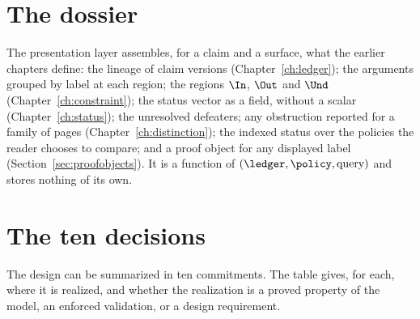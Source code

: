 \section{The dossier}\label{sec:dossier}

The presentation layer assembles, for a claim and a surface, what the earlier chapters define: the lineage of claim versions (Chapter~\ref{ch:ledger}); the arguments grouped by label at each region; the regions $\In$, $\Out$ and $\Und$ (Chapter~\ref{ch:constraint}); the status vector as a field, without a scalar (Chapter~\ref{ch:status}); the unresolved defeaters; any obstruction reported for a family of pages (Chapter~\ref{ch:distinction}); the indexed status over the policies the reader chooses to compare; and a proof object for any displayed label (Section~\ref{sec:proofobjects}). It is a function of $(\ledger,\policy,\text{query})$ and stores nothing of its own.

\section{The ten decisions}\label{sec:constitution}

The design can be summarized in ten commitments. The table gives, for each, where it is realized, and whether the realization is a proved property of the model, an enforced validation, or a design requirement.

